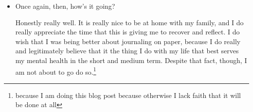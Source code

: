 \documentclass[12pt]{article}
\renewcommand{\,}{\textsuperscript{,}}
\begin{document}
\begin{itemize}
\begin{itemize}
\end{itemize}

\item Once again, then, how's it going?

Honestly really well. It is really nice to be at home with my family, and I do really appreciate the time that this is giving me to recover and reflect. I do wish that I was being better about journaling on paper, because I do really and legitimately believe that it the thing I do with my life that best serves my mental health in the short and medium term. Despite that fact, though, I am not about to go do so.\footnote{because I am doing this blog post because otherwise I lack faith that it will be done at all}

\end{itemize}
\end{document}
